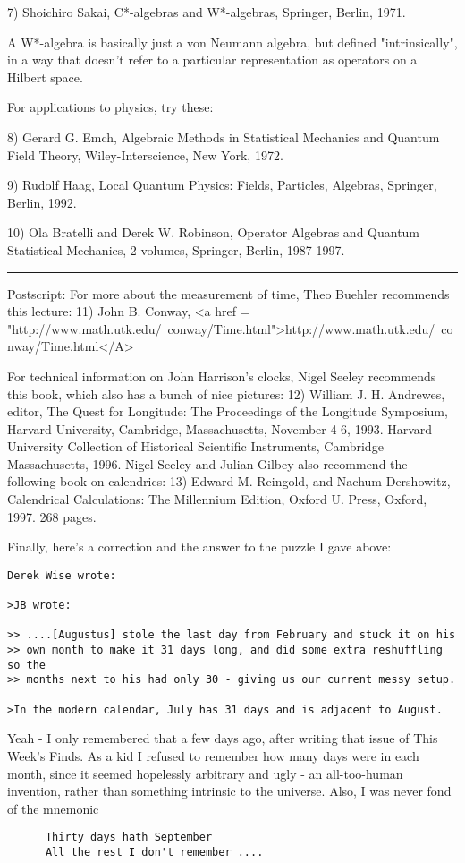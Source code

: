 7) Shoichiro Sakai, C*-algebras and W*-algebras, Springer, Berlin,
1971.

A W*-algebra is basically just a von Neumann algebra, but defined
"intrinsically", in a way that doesn't refer to a particular
representation as operators on a Hilbert space. 

For applications to physics, try these:

8) Gerard G. Emch, Algebraic Methods in Statistical Mechanics and Quantum
Field Theory, Wiley-Interscience, New York, 1972.

9) Rudolf Haag, Local Quantum Physics: Fields, Particles, Algebras,
Springer, Berlin, 1992.

10) Ola Bratelli and Derek W. Robinson, Operator Algebras and Quantum
Statistical Mechanics, 2 volumes, Springer, Berlin, 1987-1997.
\par\noindent\rule{\textwidth}{0.4pt}

Postscript:
For more about the measurement of time, 
Theo Buehler recommends this lecture:
11) John B. Conway, <a href = "http://www.math.utk.edu/~conway/Time.html">http://www.math.utk.edu/~conway/Time.html</A>

For technical information on John Harrison's clocks, Nigel Seeley
recommends this book, which also has a bunch of nice pictures:
12) William J. H. Andrewes, editor, The Quest for Longitude: The Proceedings
of the Longitude Symposium, Harvard University, Cambridge, Massachusetts,
November 4-6, 1993.  Harvard University Collection of Historical Scientific
Instruments, Cambridge Massachusetts, 1996.
Nigel Seeley and Julian Gilbey also recommend the following book on
calendrics:
13) Edward M. Reingold, and Nachum Dershowitz, Calendrical Calculations:
The Millennium Edition, Oxford U. Press, Oxford, 1997.
268 pages.

Finally, here's a correction and the answer to the puzzle I gave
above:

\begin{verbatim}
Derek Wise wrote: 

>JB wrote:

>> ....[Augustus] stole the last day from February and stuck it on his
>> own month to make it 31 days long, and did some extra reshuffling so the
>> months next to his had only 30 - giving us our current messy setup.

>In the modern calendar, July has 31 days and is adjacent to August.
\end{verbatim}
    

Yeah - I only remembered that a few days ago, after writing that
issue of This Week's Finds.  As a kid I refused to remember how
many days were in each month, since it seemed hopelessly arbitrary
and ugly - an all-too-human invention, rather than something 
intrinsic to the universe.  Also, I was never fond of the mnemonic
\begin{verbatim}
      Thirty days hath September
      All the rest I don't remember ....
\end{verbatim}
    
